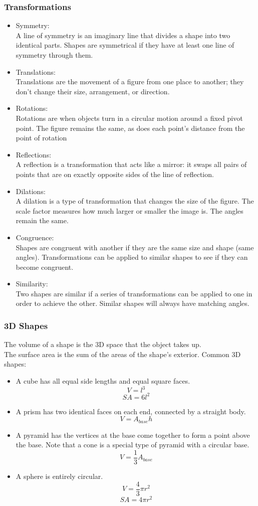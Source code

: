 \subsubsection{Transformations}
\begin{itemize}
    \item Symmetry:\\
    A line of symmetry is an imaginary line that divides a shape into two identical parts. Shapes are symmetrical if they have at least one line of symmetry through them.
    \item Translations:\\
    Translations are the movement of a figure from one place to another; they don't change their size, arrangement, or direction.
    \item Rotations:\\
    Rotations are when objects turn in a circular motion around a fixed pivot point. The figure remains the same, as does each point's distance from the point of rotation
    \item Reflections:\\
    A reflection is a transformation that acts like a mirror: it swaps all pairs of points that are on exactly opposite sides of the line of reflection.
    \item Dilations:\\
    A dilation is a type of transformation that changes the size of the figure. The scale factor measures how much larger or smaller the image is. The angles remain the same.
    \item Congruence:\\
    Shapes are congruent with another if they are the same size and shape (same angles). Transformations can be applied to similar shapes to see if they can become congruent.
    \item Similarity:\\
    Two shapes are similar if a series of transformations can be applied to one in order to achieve the other. Similar shapes will always have matching angles.
\end{itemize}

\subsubsection{3D Shapes}
The volume of a shape is the 3D space that the object takes up.\\
The surface area is the sum of the areas of the shape's exterior.
Common 3D shapes:
\begin{itemize}
    \item A cube has all equal side lengths and equal square faces.
    $$V=l^3$$
    $$SA=6l^2$$
    \item A prism has two identical faces on each end, connected by a straight body.
    $$V=A_{base}h$$
    \item A pyramid has the vertices at the base come together to form a point above the base. Note that a cone is a special type of pyramid with a circular base.
    $$V=\frac{1}{3}A_{base}$$
    \item A sphere is entirely circular.
    $$V=\frac{4}{3}\pi r^2$$
    $$SA=4\pi r^2$$
\end{itemize}